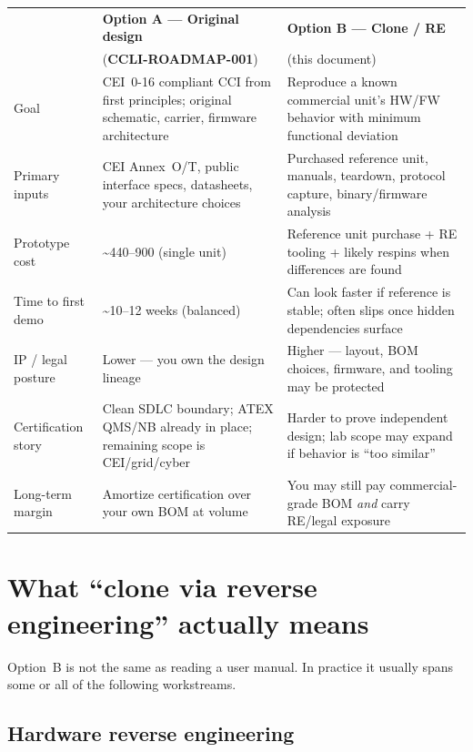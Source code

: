 \documentclass[11pt,a4paper]{article}
\newcommand{\docref}[1]{\textbf{#1}}
\begin{document}
\begin{tabularx}{\linewidth}{@{}>{\raggedright\arraybackslash}p{30mm}X X@{}}
\toprule
 & \textbf{Option A --- Original design} & \textbf{Option B --- Clone / RE} \\
 & (\docref{CCLI-ROADMAP-001}) & (this document) \\
\midrule
Goal &
CEI~0-16 compliant CCI from first principles; original schematic, carrier, firmware architecture &
Reproduce a known commercial unit's HW/FW behavior with minimum functional deviation \\
Primary inputs &
CEI Annex~O/T, public interface specs, datasheets, your architecture choices &
Purchased reference unit, manuals, teardown, protocol capture, binary/firmware analysis \\
Prototype cost &
\textasciitilde{}\EUR{}440--900 (single unit) &
Reference unit purchase + RE tooling + likely respins when differences are found \\
Time to first demo &
\textasciitilde{}10--12 weeks (balanced) &
Can look faster if reference is stable; often slips once hidden dependencies surface \\
IP / legal posture &
Lower --- you own the design lineage &
Higher --- layout, BOM choices, firmware, and tooling may be protected \\
Certification story &
Clean SDLC boundary; ATEX QMS/NB already in place; remaining scope is CEI/grid/cyber &
Harder to prove independent design; lab scope may expand if behavior is ``too similar'' \\
Long-term margin &
Amortize certification over your own BOM at volume &
You may still pay commercial-grade BOM \emph{and} carry RE/legal exposure \\
\bottomrule
\end{tabularx}

\section{What ``clone via reverse engineering'' actually means}

Option~B is not the same as reading a user manual. In practice it usually spans some or all of the following workstreams.

\subsection{Hardware reverse engineering}
\end{document}
